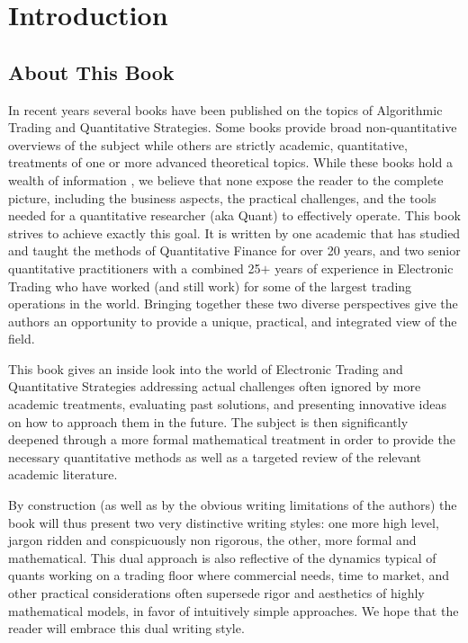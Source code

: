 \chapter{Introduction}\label{chap:ch_intro}
\section{About This Book}

In recent years several books have been published  on the topics of Algorithmic Trading and Quantitative Strategies. Some books provide broad non-quantitative overviews of the subject while others are strictly academic, quantitative, treatments of one or more advanced theoretical topics. While these books hold a wealth of  information , we believe that none expose the reader to the complete picture, including the business aspects, the  practical challenges, and the tools needed for a quantitative researcher (aka Quant) to effectively operate.  This book strives to achieve exactly this goal. It is written by one academic that has studied and taught the methods of Quantitative Finance for over 20 years, and two senior quantitative practitioners with a combined 25$+$ years of experience in Electronic Trading who have worked (and still work) for some of the largest trading operations in the world. Bringing together these two diverse perspectives give the authors an opportunity to provide a unique,  practical, and integrated view of the field.


This book gives an inside look into the world of Electronic Trading and Quantitative Strategies addressing  actual challenges  often ignored by more academic treatments, evaluating past solutions, and presenting innovative ideas on how to approach them in the future. The subject is  then significantly deepened through a more formal mathematical treatment in order to provide the necessary quantitative methods as well as a targeted review of the relevant academic literature.


By construction (as well as by the obvious writing limitations of the authors) the book will thus present two very distinctive writing styles: one more high level, jargon ridden and conspicuously non rigorous, the other,  more formal and mathematical.  This dual approach is also reflective of the dynamics typical of quants working on a trading floor where commercial needs, time to market, and other practical considerations often supersede rigor and aesthetics of highly mathematical models, in favor of intuitively simple approaches. We hope that the reader will embrace this dual writing style.


